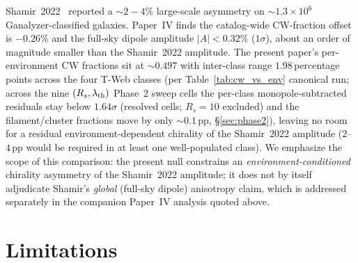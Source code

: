 \documentclass[twocolumn,linenumbers]{aastex702}
\begin{document}
Shamir~2022~\cite{Shamir2022DESI} reported a $\sim 2\!-\!4\%$
large-scale asymmetry on $\sim\!1.3\!\times\!10^6$ Ganalyzer-classified
galaxies. Paper~IV finds the catalog-wide CW-fraction offset is
$-0.26\%$ and the full-sky dipole amplitude $|A|\!<\!0.32\%$
($1\sigma$), about an order of magnitude smaller than the Shamir~2022
amplitude. The present paper's per-environment CW fractions sit at
$\sim 0.497$ with inter-class range $1.98$\,percentage points across the four
T-Web classes (per Table~\ref{tab:cw_vs_env} canonical run; across
the nine $(R_s, \lambda_{\rm th})$ Phase~2
sweep cells the per-class monopole-subtracted residuals stay below
$1.64\sigma$ (resolved cells; $R_s\!=\!10$ excluded) and the filament/cluster fractions move by
only ${\sim}0.1$\,pp, \S\ref{sec:phase2}), leaving no room
for a residual environment-dependent chirality of the Shamir~2022
amplitude ($2$--$4$\,pp would be required in at least one well-populated
class). We emphasize the scope of this comparison: the present null
constrains an \emph{environment-conditioned} chirality asymmetry of
the Shamir~2022 amplitude; it does not by itself adjudicate
Shamir's \emph{global} (full-sky dipole) anisotropy claim, which is
addressed separately in the companion Paper~IV analysis quoted above.

\section{Limitations}\label{sec:limitations}
\end{document}
